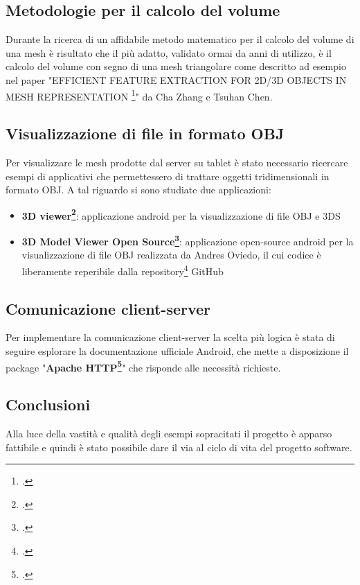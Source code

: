 \newpage
\subsection{Metodologie per il calcolo del volume}
Durante la ricerca di un affidabile metodo matematico per il calcolo del volume di una mesh è risultato che il più adatto, validato ormai da anni di utilizzo, è il calcolo del volume con segno di una mesh triangolare come descritto ad esempio nel paper "EFFICIENT FEATURE EXTRACTION FOR 2D/3D OBJECTS IN MESH REPRESENTATION \footcite{http://research.microsoft.com/en-us/um/people/chazhang/publications/icip01_ChaZhang.pdf}" da Cha Zhang e Tsuhan Chen.

\subsection{Visualizzazione di file in formato OBJ}
Per visualizzare le mesh prodotte dal server su tablet è stato necessario ricercare esempi di applicativi che permettessero di trattare oggetti tridimensionali in formato OBJ. A tal riguardo si sono studiate due applicazioni:
\begin{itemize}
\item\textbf{3D viewer\footcite{https://play.google.com/store/apps/details?id=com.pcvirt.Viewer3D&hl=it}}: 
applicazione android per la visualizzazione di file OBJ e 3DS
\item\textbf{3D Model Viewer Open Source\footcite{https://play.google.com/store/apps/details?id=org.andresoviedo.dddmodel&hl=it}}:
applicazione open-source android per la visualizzazione di file OBJ realizzata da Andres Oviedo, il cui codice è liberamente reperibile dalla repository\footcite{https://github.com/andresoviedo/android-3D-model-viewer} GitHub
\end{itemize}

\subsection{Comunicazione client-server}
Per implementare la comunicazione client-server la scelta più logica è stata di seguire esplorare la documentazione ufficiale Android, che mette a disposizione il package "\textbf{Apache HTTP\footcite{https://developer.android.com/reference/org/apache/http/package-summary.html}}" che risponde alle necessità richieste.

\subsection{Conclusioni}
Alla luce della vastità e qualità degli esempi sopracitati il progetto è apparso fattibile e quindi è stato possibile dare il via al ciclo di vita del progetto software.


